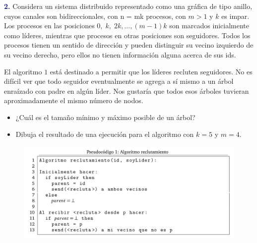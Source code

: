 \newpage
\textbf{\textcolor{MidnightBlue}{2.}}
Considera un sistema distribuido representado como una gráfica de tipo anillo, cuyos
canales son bidireccionales, con n = mk procesos, con $m > 1$ y $k$ es impar. Los procesos en las
posiciones $0,\; k,\; 2k, . . . ,(m-1)k$ son marcados inicialmente como líderes, mientras que procesos
en otras posiciones son seguidores. Todos los procesos tienen un sentido de dirección y pueden
distinguir su vecino izquierdo de su vecino derecho, pero ellos no tienen información alguna
acerca de sus ids. \newline

El algoritmo $1$ está destinado a permitir que los líderes recluten seguidores. No es difícil ver que
todo seguidor eventualmente se agrega a sí mismo a un árbol enraízado con padre en algún líder.
Nos gustaría que todos esos árboles tuvieran aproximadamente el mismo número de nodos.

\begin{itemize}
\item ¿Cuál es el tamaño mínimo y máximo posible de un árbol?
      
\item Dibuja el resultado de una ejecución para el algoritmo con $k = 5$  y $m = 4.$
      
\end{itemize}

\begin{figure}[ht]
        \begin{center}
                \includegraphics[width=15cm]{AlgReclutamiento.png}
        \end{center}
\end{figure}

